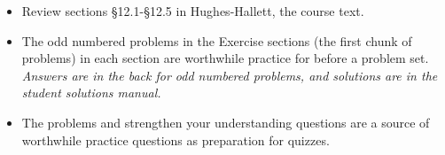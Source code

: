 \documentclass[12pt,letterpaper]{exam}
\begin{document}
 \pdfpageheight 11in 
  \pdfpagewidth 8.5in

\begin{itemize}
\itemsep0em
    \item Review sections \S 12.1-\S 12.5 in Hughes-Hallett, the course text.
    \item The odd numbered problems in the Exercise sections (the first chunk of problems) in each section are worthwhile practice for before a problem set.  \emph{Answers are in the back for odd numbered problems, and solutions are in the student solutions manual.}
    \item The problems and strengthen your understanding questions are a source of worthwhile practice questions as preparation for quizzes.
\end{itemize}
\end{document}
